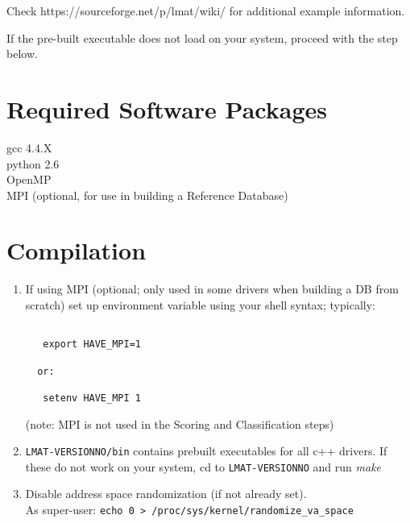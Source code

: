 \documentclass[11pt]{article}
\newcommand{\lmatver}{VERSIONNO}
\begin{document}
Check https://sourceforge.net/p/lmat/wiki/ for additional example information.

If the pre-built executable does not load on your system, proceed with the  step below.

\section{Required Software Packages}

gcc 4.4.X\\
python 2.6\\
OpenMP\\
MPI (optional, for use in building a Reference Database)

\section{Compilation}
\label{sec:compile}

\begin{enumerate}

%
%
%
%
%
%


\item

If using MPI (optional; only used in some drivers when building
    a DB from scratch) set up environment variable using your shell syntax; typically: 
\begin{verbatim}

   export HAVE_MPI=1

  or:

   setenv HAVE_MPI 1
\end{verbatim}

   (note: MPI is not used in the Scoring and Classification
    steps)


\item

         \texttt{LMAT-\lmatver/bin} contains prebuilt executables for all c++ drivers.
         If these do not work on your system,
         cd to \texttt{LMAT-\lmatver} and run {\em make}
\item
 Disable address space randomization (if not already set).\\
   As super-user: \texttt{echo 0 > /proc/sys/kernel/randomize\_va\_space}
\end{enumerate}
\end{document}

